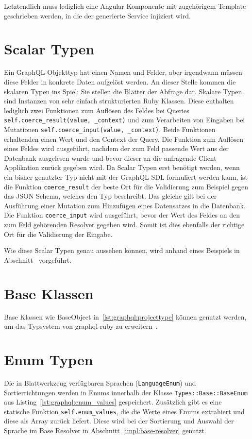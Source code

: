Letztendlich muss lediglich eine Angular Komponente mit zugehörigem Template geschrieben werden, in die der generierte Service injiziert wird.

\section{Scalar Typen}
\label{graphql:scalartypes}
Ein GraphQL-Objekttyp hat einen Namen und Felder, aber irgendwann müssen diese Felder in konkrete Daten aufgelöst werden. An dieser Stelle kommen die skalaren Typen ins Spiel: Sie stellen die Blätter der Abfrage dar. 
Skalare Typen sind Instanzen von sehr einfach strukturierten Ruby Klassen. Diese enthalten lediglich zwei Funktionen zum Auflösen des Feldes bei Queries \texttt{self.coerce\_result(value, \_context)} und zum Verarbeiten von Eingaben bei Mutationen \texttt{self.coerce\_input(value, \_context)}. Beide Funktionen erhaltenden einen Wert und den Context der Query. Die Funktion zum Auflösen eines Feldes wird ausgeführt, nachdem der zum Feld passende Wert aus der Datenbank ausgelesen wurde und bevor dieser an die anfragende Client Applikation zurück gegeben wird. Da Scalar Typen erst benötigt werden, wenn ein bisher genutzter Typ nicht mit der GraphQL SDL formuliert werden kann, ist die Funktion \texttt{coerce\_result} der beste Ort für die Validierung zum Beispiel gegen das JSON Schema, welches den Typ beschreibt. Das gleiche gilt bei der Ausführung einer Mutation zum Hinzufügen eines Datensatzes in die Datenbank. Die Funktion \texttt{coerce\_input} wird ausgeführt, bevor der Wert des Feldes an den zum Feld gehörenden Resolver gegeben wird. Somit ist dies ebenfalls der richtige Ort für die Validierung der Eingabe.

Wie diese Scalar Typen genau aussehen können, wird anhand eines Beispiels in Abschnitt~ vorgeführt.

\section{Base Klassen}
\label{graphql:baseclass}
Base Klassen wie BaseObject in~\ref{lst:graphql:projecttype} können genutzt werden, um das Typsystem von graphql-ruby zu erweitern~\cite{graphql-extending}. 

\section{Enum Typen}
\label{graphql:enumtypes}
Die in Blattwerkzeug verfügbaren Sprachen (\texttt{LanguageEnum}) und Sortierrichtungen werden in Enums innerhalb der Klasse \texttt{Types::Base::BaseEnum} aus Listing~\ref{lst:graphql:enum_values} gespeichert. Zusätzlich gibt es eine statische Funktion \texttt{self.enum\_values}, die die Werte eines Enums extrahiert und diese als Array zurück liefert. Diese wird bei der Sortierung und Auswahl der Sprache im Base Resolver in Abschnitt~\ref{impl:base-resolver} genutzt.

